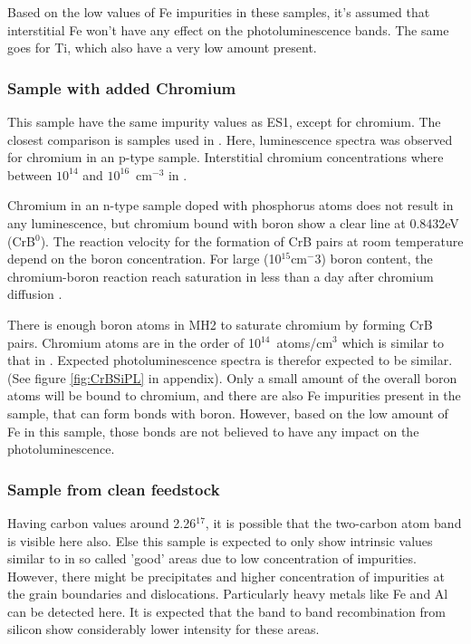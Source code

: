 Based on the low values of Fe impurities in these samples, it's assumed that interstitial Fe won't have any effect on the photoluminescence bands. The same goes for Ti, which also have a very low amount present.


\subsubsection{Sample with added Chromium}

This sample have the same impurity values as ES1, except for chromium. The closest comparison is samples used in \cite{conzelmann82}. Here, luminescence spectra was observed for chromium in an p-type sample. Interstitial chromium concentrations where between $10^{14}$ and $10^{16} $~cm$^{-3}$ in \cite{conzelmann82}.

Chromium in an n-type sample doped with phosphorus atoms does not result in any luminescence, but chromium bound with boron show a clear line at 0.8432eV (CrB$^0$). The reaction velocity for the formation of CrB pairs at room temperature depend on the boron concentration. For large (10$^15$cm$^-3$) boron content, the chromium-boron reaction reach saturation in less than a day after chromium diffusion \cite{conzelmann82}.

There is enough boron atoms in MH2 to saturate chromium by forming CrB pairs. Chromium atoms are in the order of 10$^{14}$~atoms/cm$^3$ which is similar to that in \cite{conzelmann82}. Expected photoluminescence spectra is therefor expected to be similar. (See figure \ref{fig:CrBSiPL} in appendix). Only a small amount of the overall boron atoms will be bound to chromium, and there are also Fe impurities present in the sample, that can form bonds with boron. However, based on the low amount of Fe in this sample, those bonds are not believed to have any impact on the photoluminescence.

\subsubsection{Sample from clean feedstock}

Having carbon values around 2.26$^{17}$, it is possible that the two-carbon atom band is visible here also. Else this sample is expected to only show intrinsic values similar to \cite{dean67} in so called 'good' areas due to low concentration of impurities. However, there might be precipitates and higher concentration of impurities at the grain boundaries and dislocations. Particularly heavy metals like Fe and Al can be detected here. It is expected that the band to band recombination from silicon show considerably lower intensity for these areas.


